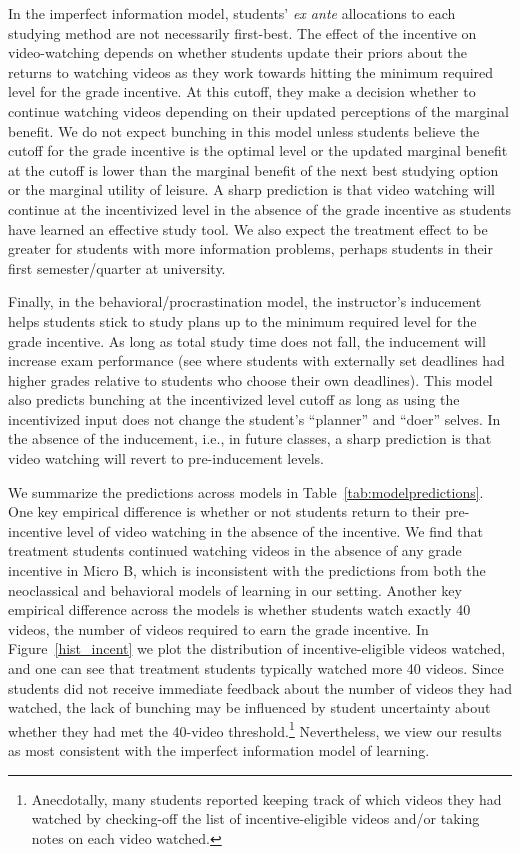 \documentclass[12pt]{article}
\begin{document}
In the imperfect information model, students' \textit{ex ante} allocations to each studying method are not necessarily first-best.
The effect of the incentive on video-watching depends on whether students update their priors about the returns to watching videos as they work towards hitting the minimum required level for the grade incentive.
At this cutoff, they make a decision whether to continue watching videos depending on their updated perceptions of the marginal benefit.
We do not expect bunching in this model unless students believe the cutoff for the grade incentive is the optimal level or the updated marginal benefit at the cutoff is lower than the marginal benefit of the next best studying option or the marginal utility of leisure.
A sharp prediction is that video watching will continue at the incentivized level in the absence of the grade incentive as students have learned an effective study tool.
We also expect the treatment effect to be greater for students with more information problems, perhaps students in their first semester/quarter at university.

Finally, in the behavioral/procrastination model, the instructor's inducement helps students stick to study plans up to the minimum required level for the grade incentive.
As long as total study time does not fall, the inducement will increase exam performance (see \textcite{aw2002} where students with externally set deadlines had higher grades relative to students who choose their own deadlines).
This model also predicts bunching at the incentivized level cutoff as long as using the incentivized input does not change the student's ``planner'' and ``doer'' selves.
In the absence of the inducement, i.e., in future classes, a sharp prediction is that video watching will revert to pre-inducement levels.

We summarize the predictions across models in Table~\ref{tab:modelpredictions}.
One key empirical difference is whether or not students return to their pre-incentive level of video watching in the absence of the incentive.
We find that treatment students continued watching videos in the absence of any grade incentive in Micro B, which is inconsistent with the predictions from both the neoclassical and behavioral models of learning in our setting.
Another key empirical difference across the models is whether students watch exactly 40 videos, the number of videos required to earn the grade incentive.
In Figure~\ref{hist_incent} we plot the distribution of incentive-eligible videos watched, and one can see that treatment students typically watched more 40 videos.
Since students did not receive immediate feedback about the number of videos they had watched, the lack of bunching may be influenced by student uncertainty about whether they had met the 40-video threshold.\footnote{Anecdotally, many students reported keeping track of which videos they had watched by checking-off the list of incentive-eligible videos and/or taking notes on each video watched.} Nevertheless, we view our results as most consistent with the imperfect information model of learning.
\end{document}
